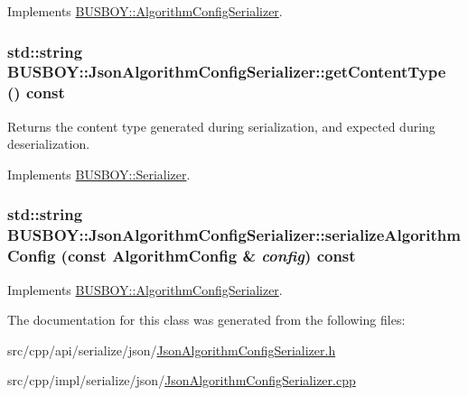 Implements \hyperlink{classBUSBOY_1_1AlgorithmConfigSerializer_a39d110a8d569616b55c0486d62ad21ba}{BUSBOY::AlgorithmConfigSerializer}.\hypertarget{classBUSBOY_1_1JsonAlgorithmConfigSerializer_ab477ff6ef5cd3a5310d4716c358e16fd}{
\subsubsection[{getContentType}]{\setlength{\rightskip}{0pt plus 5cm}std::string BUSBOY::JsonAlgorithmConfigSerializer::getContentType () const}}
\label{classBUSBOY_1_1JsonAlgorithmConfigSerializer_ab477ff6ef5cd3a5310d4716c358e16fd}


Returns the content type generated during serialization, and expected during deserialization. 

Implements \hyperlink{classBUSBOY_1_1Serializer_aadfd0df50149a0c59424b5910c5ae3ef}{BUSBOY::Serializer}.\hypertarget{classBUSBOY_1_1JsonAlgorithmConfigSerializer_af364fc4f8156013bdc1957c9a10d4eed}{
\subsubsection[{serializeAlgorithmConfig}]{\setlength{\rightskip}{0pt plus 5cm}std::string BUSBOY::JsonAlgorithmConfigSerializer::serializeAlgorithmConfig (const {\bf AlgorithmConfig} \& {\em config}) const}}
\label{classBUSBOY_1_1JsonAlgorithmConfigSerializer_af364fc4f8156013bdc1957c9a10d4eed}


Implements \hyperlink{classBUSBOY_1_1AlgorithmConfigSerializer_aab7e9c8da6db22fd09cc1faf8758e58f}{BUSBOY::AlgorithmConfigSerializer}.

The documentation for this class was generated from the following files:\begin{DoxyCompactItemize}
\item 
src/cpp/api/serialize/json/\hyperlink{JsonAlgorithmConfigSerializer_8h}{JsonAlgorithmConfigSerializer.h}\item 
src/cpp/impl/serialize/json/\hyperlink{JsonAlgorithmConfigSerializer_8cpp}{JsonAlgorithmConfigSerializer.cpp}\end{DoxyCompactItemize}
